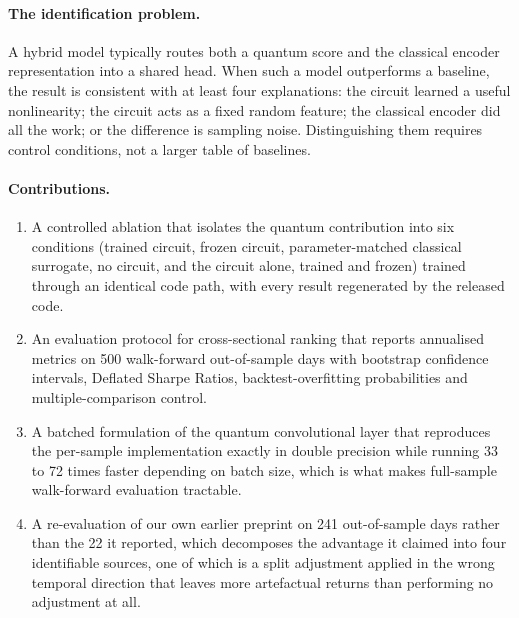 \paragraph{The identification problem.}
A hybrid model typically routes both a quantum score and the classical encoder
representation into a shared head. When such a model outperforms a baseline, the
result is consistent with at least four explanations: the circuit learned a
useful nonlinearity; the circuit acts as a fixed random feature; the classical
encoder did all the work; or the difference is sampling noise. Distinguishing
them requires control conditions, not a larger table of baselines.

\paragraph{Contributions.}
\begin{enumerate}
  \item A controlled ablation that isolates the quantum contribution into six
    conditions (trained circuit, frozen circuit, parameter-matched classical
    surrogate, no circuit, and the circuit alone, trained and frozen) trained
    through an identical code path, with every result regenerated by the
    released code.
  \item An evaluation protocol for cross-sectional ranking that reports
    annualised metrics on \num{500} walk-forward out-of-sample days with
    bootstrap confidence intervals, Deflated Sharpe Ratios, backtest-overfitting
    probabilities and multiple-comparison control.
  \item A batched formulation of the quantum convolutional layer that reproduces
    the per-sample implementation exactly in double precision while running
    \num{33} to \num{72} times faster depending on batch size, which is what
    makes full-sample walk-forward evaluation tractable.
  \item A re-evaluation of our own earlier preprint
    \citep{chen2025quantumb} on \num{241} out-of-sample days rather than the
    \num{22} it reported, which decomposes the advantage it claimed into four
    identifiable sources, one of which is a split adjustment applied in the
    wrong temporal direction that leaves more artefactual returns than
    performing no adjustment at all.
\end{enumerate}

